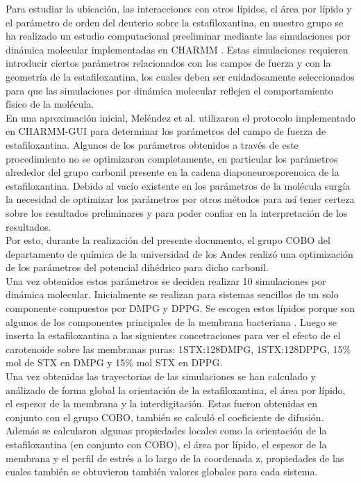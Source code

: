 Para estudiar la ubicaci\'{o}n, las interacciones con otros l\'{i}pidos, el \'{a}rea por l\'{i}pido y el par\'{a}metro de orden del deuterio  sobre la estafiloxantina, en nuestro grupo se ha realizado un estudio computacional preeliminar mediante las simulaciones por din\'{a}mica molecular  implementadas en CHARMM \cite{Melendez-Delgado2018StudyingBilayers}. Estas simulaciones requieren introducir ciertos par\'{a}metros relacionados con los campos de fuerza y con la geometr\'{i}a de la estafiloxantina, los cuales deben ser cuidadosamente seleccionados para que las simulaciones por din\'{a}mica molecular reflejen el comportamiento f\'{i}sico de la mol\'{e}cula.\\

En una aproximaci\'{o}n inicial, Mel\'{e}ndez et al. \cite{Melendez-Delgado2018StudyingBilayers} utilizaron el protocolo implementado en CHARMM-GUI \cite{Brooks2009} para determinar los par\'{a}metros del campo de fuerza de estafiloxantina. Algunos de los par\'{a}metros obtenidos a trav\'{e}s de este procedimiento no se optimizaron completamente, en particular los par\'{a}metros alrededor del grupo carbonil presente en la cadena diaponeurosporenoica de la estafiloxantina. Debido al vac\'{i}o existente en los par\'{a}metros de la mol\'{e}cula surg\'{i}a la necesidad de optimizar los par\'{a}metros por otros m\'{e}todos para as\'{i} tener certeza sobre los resultados preliminares y para poder confiar en la interpretaci\'{o}n de los resultados.\\

Por esto, durante la realizaci\'{o}n del presente documento, el grupo COBO del departamento de qu\'{i}mica de la universidad de los Andes realiz\'{o} una optimizaci\'{o}n de los par\'{a}metros del potencial dih\'{e}drico para dicho carbonil. \\

Una vez obtenidos estos par\'{a}metros se deciden realizar 10 simulaciones por din\'{a}mica molecular. Inicialmente se realizan para sistemas sencillos de un solo componente compuestos por DMPG y DPPG. Se escogen estos l\'{i}pidos porque son algunos de los componentes principales de la membrana bacteriana \cite{Sohlenkamp2015BacterialPathways}. Luego se inserta la estafiloxantina a las siguientes concetraciones para ver el efecto de el carotenoide sobre las membranas puras: 1STX:128DMPG, 1STX:128DPPG, 15\% mol de STX en DMPG y 15\% mol STX en DPPG.\\

Una vez obtenidas las trayectorias de las simulaciones se han calculado y an\'{a}lizado de forma global la orientaci\'{o}n de la estafiloxantina, el \'{a}rea por l\'{i}pido, el espesor de la membrana y la interdigitaci\'{o}n. Estas fueron obtenidas en conjunto con el grupo COBO, tambi\'{e}n se calcul\'{o} el coeficiente de difusi\'{o}n. Adem\'{a}s se calcularon algunas propiedades locales como la orientaci\'{o}n de la estafiloxantina (en conjunto con COBO), el \'{a}rea por l\'{i}pido, el espesor de la membrana y el perfil de estr\'{e}s a lo largo de la coordenada z, propiedades de las cuales tambi\'{e}n se obtuvieron tambi\'{e}n valores globales para cada sistema. 
